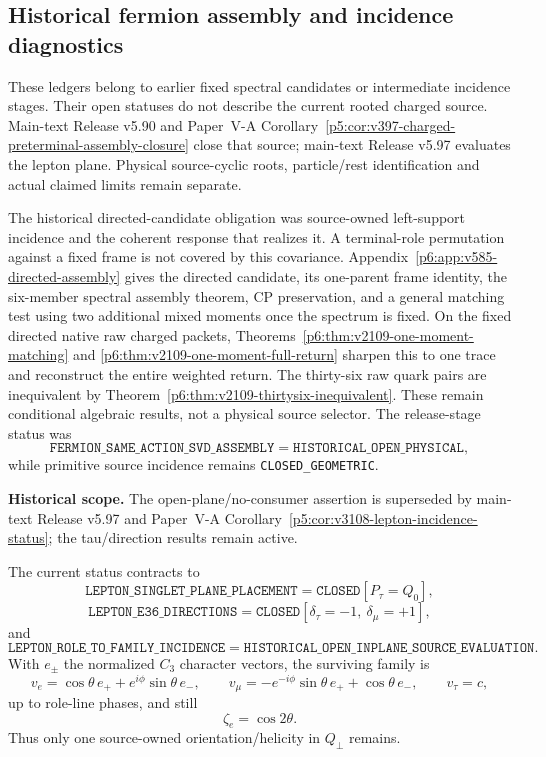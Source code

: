 \documentclass[11pt,a4paper]{article}
\begin{document}



\subsection{Historical fermion assembly and incidence diagnostics}
\label{p6:app:v2187-historical-fermion-assembly}
These ledgers belong to earlier fixed spectral candidates or intermediate
incidence stages. Their open statuses do not describe the current rooted
charged source. Main-text Release v5.90 and Paper~V-A
Corollary~\ref{p5:cor:v397-charged-preterminal-assembly-closure}
close that source; main-text Release v5.97 evaluates the lepton plane.
Physical source-cyclic roots, particle/rest identification and actual
claimed limits remain separate.

The historical directed-candidate obligation was source-owned left-support incidence
and the coherent response that realizes it. A terminal-role permutation
against a fixed frame is not covered by this covariance.
Appendix~\ref{p6:app:v585-directed-assembly} gives the directed candidate,
its one-parent frame identity, the six-member spectral assembly theorem,
CP preservation, and a general matching test using two additional mixed
moments once the spectrum is fixed.  On the fixed directed native raw
charged packets, Theorems~\ref{p6:thm:v2109-one-moment-matching} and
\ref{p6:thm:v2109-one-moment-full-return} sharpen this to one trace and
reconstruct the entire weighted return.  The thirty-six raw quark pairs are
inequivalent by Theorem~\ref{p6:thm:v2109-thirtysix-inequivalent}.
These remain conditional algebraic results, not a physical source selector.
The release-stage status was
\[
 \texttt{FERMION\_SAME\_ACTION\_SVD\_ASSEMBLY}
 =\texttt{HISTORICAL\_OPEN\_PHYSICAL},
\]
while primitive source incidence remains \texttt{CLOSED\_GEOMETRIC}.


\begin{corollary}
\label{p6:cor:v596-lepton-inplane-frontier}
\noindent\textbf{Historical scope.} The open-plane/no-consumer assertion is superseded by main-text Release v5.97 and Paper~V-A Corollary~\ref{p5:cor:v3108-lepton-incidence-status}; the tau/direction results remain active.

The current status contracts to
\[
 \boxed{\texttt{LEPTON\_SINGLET\_PLANE\_PLACEMENT}
 =\texttt{CLOSED}[P_\tau=Q_0],}
\]
\[
 \boxed{\texttt{LEPTON\_E36\_DIRECTIONS}=\texttt{CLOSED}
 [\delta_\tau=-1,\ \delta_\mu=+1],}
\]
and
\[
 \boxed{\texttt{LEPTON\_ROLE\_TO\_FAMILY\_INCIDENCE}
 =\texttt{HISTORICAL\_OPEN\_INPLANE\_SOURCE\_EVALUATION}.}
\]
With $e_\pm$ the normalized $C_3$ character vectors, the surviving family is
\[
 v_e=\cos\theta\,e_+ +e^{i\phi}\sin\theta\,e_-,\qquad
 v_\mu=-e^{-i\phi}\sin\theta\,e_+ +\cos\theta\,e_-,\qquad
 v_\tau=c,
\]
up to role-line phases, and still
\[
 \boxed{\zeta_e=\cos2\theta.}
\]
Thus only one source-owned orientation/helicity in $Q_\perp$ remains.
\end{corollary}
\end{document}
